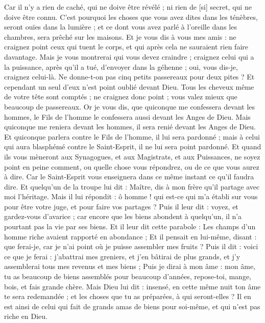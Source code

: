 \begin{multicols}{2}
Car il n'y a rien de caché, qui ne doive être révélé ; ni rien de [si] secret, qui ne doive être connu.
C'est pourquoi les choses que vous avez dites dans les ténèbres, seront ouïes dans la lumière ; et ce dont vous avez parlé à l'oreille dans les chambres, sera prêché sur les maisons.
Et je vous dis à vous mes amis : ne craignez point ceux qui tuent le corps, et qui après cela ne sauraient rien faire davantage.
Mais je vous montrerai qui vous devez craindre ; craignez celui qui a la puissance, après qu'il a tué, d'envoyer dans la géhenne ; oui, vous dis-je, craignez celui-là.
Ne donne-t-on pas cinq petits passereaux pour deux pites ? Et cependant un seul d'eux n'est point oublié devant Dieu.
Tous les cheveux même de votre tête sont comptés ; ne craignez donc point ; vous valez mieux que beaucoup de passereaux.
Or je vous dis, que quiconque me confessera devant les hommes, le Fils de l'homme le confessera aussi devant les Anges de Dieu.
Mais quiconque me reniera devant les hommes, il sera renié devant les Anges de Dieu.
Et quiconque parlera contre le Fils de l'homme, il lui sera pardonné ; mais à celui qui aura blasphémé contre le Saint-Esprit, il ne lui sera point pardonné.
Et quand ils vous mèneront aux Synagogues, et aux Magistrats, et aux Puissances, ne soyez point en peine comment, ou quelle chose vous répondrez, ou de ce que vous aurez à dire.
Car le Saint-Esprit vous enseignera dans ce même instant ce qu'il faudra dire.
Et quelqu'un de la troupe lui dit : Maître, dis à mon frère qu'il partage avec moi l'héritage.
Mais il lui répondit : ô homme ! qui est-ce qui m'a établi sur vous pour être votre juge, et pour faire vos partages ?
Puis il leur dit : voyez, et gardez-vous d'avarice ; car encore que les biens abondent à quelqu'un, il n'a pourtant pas la vie par ses biens.
Et il leur dit cette parabole : Les champs d'un homme riche avaient rapporté en abondance ;
Et il pensait en lui-même, disant : que ferai-je, car je n'ai point où je puisse assembler mes fruits ?
Puis il dit : voici ce que je ferai : j'abattrai mes greniers, et j'en bâtirai de plus grands, et j'y assemblerai tous mes revenus et mes biens ;
Puis je dirai à mon âme : mon âme, tu as beaucoup de biens assemblés pour beaucoup d'années, repose-toi, mange, bois, et fais grande chère.
Mais Dieu lui dit : insensé, en cette même nuit ton âme te sera redemandée ; et les choses que tu as préparées, à qui seront-elles ?
Il en est ainsi de celui qui fait de grands amas de biens pour soi-même, et qui n'est pas riche en Dieu.

\end{multicols}
